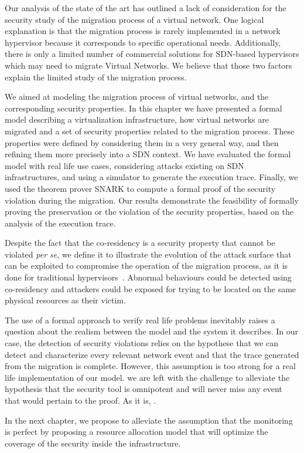 Our analysis of the state of the art has outlined a lack of consideration for the security study of the migration process of a virtual network.
One logical explanation is that the migration process is rarely implemented in a network hypervisor because it corresponds to specific operational needs. Additionally, there is only a limited number of commercial solutions for SDN-based hypervisors which may need to migrate Virtual Networks. We believe that those two factors explain the limited study of the migration process.

We aimed at modeling the migration process of virtual networks, and the corresponding security properties.
In this chapter we have presented a formal model describing a virtualization infrastructure, how virtual networks are migrated  and a set of security properties related to the migration process. These properties were defined by considering them in a very general way, and then refining them more precisely into a SDN context. We have evaluated the formal model with real life use cases, considering attacks existing on SDN infrastructures, and using a simulator to generate the execution trace. Finally, we used the theorem prover SNARK to compute a formal proof of the security violation during the migration. Our results demonstrate the feasibility of formally proving the preservation or the violation of the security properties, based on the analysis of the execution trace.

Despite the fact that the co-residency is a security property that cannot be violated \textit{per se}, we define it to illustrate the evolution of the attack surface that can be exploited to compromise the operation of the migration process, as it is done for traditional hypervisors~\cite{stalling-atya2017,malicious-atya2017}.
Abnormal behaviours could be detected using co-residency and attackers could be exposed for trying to be located on the same physical resources as their victim. 

The use of a formal approach to verify real life problems inevitably raises a question about the realism between the model and the system it describes.
In our case, the detection of security violations relies on the hypothese that we can detect and characterize every relevant network event and that the trace generated from the migration is complete. However, this assumption is too strong for a real life implementation of our model. we are left with the challenge to alleviate the hypothesis that the security tool is omnipotent and will never miss any event that would pertain to the proof. As it is, .

In the next chapter, we propose to alleviate the assumption that the monitoring is perfect by proposing a resource allocation model that will optimize the coverage of the security inside the infrastructure.